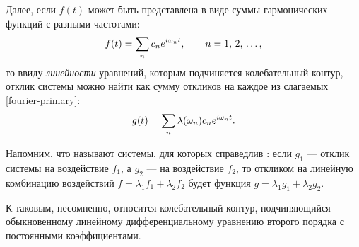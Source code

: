 Далее, если $f(t)$ может быть представлена в виде суммы гармонических функций
с разными частотами:
\begin{equation}
\eqmark{fourier-primary}
f(t) = \sum_n c_n e^{i\omega_n t},\qquad n=1,\,2,\,\ldots,
\end{equation}
то ввиду \emph{линейности} уравнений, которым подчиняется колебательный
контур, отклик системы можно найти как сумму откликов на каждое из 
слагаемых \eqref{fourier-primary}:
\begin{equation}
 \eqmark{fourier-secondary}
 g(t) = \sum_n \lambda(\omega_n) c_n e^{i\omega_n t}.
\end{equation}
\vspace*{-1pc}

\begin{lab:note}
Напомним, что  называют системы, для которых справедлив 
: если $g_1$ --- отклик системы на воздействие 
$f_1$, а $g_2$ --- на воздействие $f_2$, то откликом на линейную комбинацию
воздействий $f=\lambda_1 f_1 + \lambda_2 f_2$ будет функция 
$g=\lambda_1 g_1 + \lambda_2 g_2$.

К таковым, несомненно, относится колебательный контур, подчиняющийся обыкновенному 
линейному дифференциальному уравнению второго порядка с постоянными коэффициентами.
\end{lab:note}






